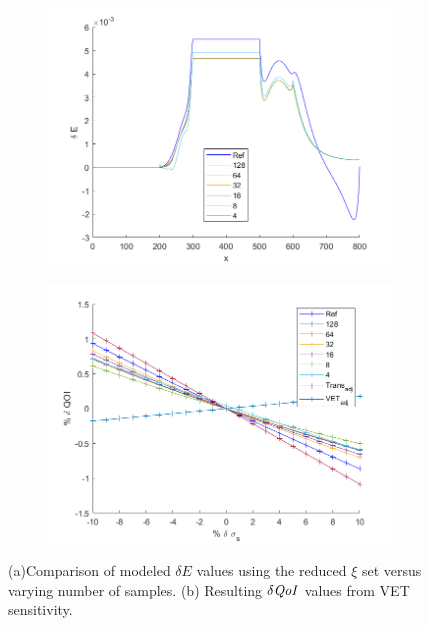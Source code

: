 \documentclass{article}
\newcommand{\qoi}{{\it QoI}\xspace}
\begin{document}
\begin{figure}[H]
\centering
  \begin{subfigure}{.5\textwidth}
  \includegraphics[width=0.98 \linewidth]{E2_nsamples.png}
  \caption{}
  \label{fig:E2n}
  \end{subfigure}%
  \begin{subfigure}{.5\textwidth}
  \includegraphics[width=0.98 \linewidth]{E2_dqoi.png}
  \caption{}
  \label{fig:E2dqoi}
  \end{subfigure}%
  \caption{(a)Comparison of modeled $\delta E$ values using the reduced $\xi$ set versus varying number of samples. (b) Resulting $\delta \qoi$ values from VET sensitivity.}
\end{figure} 
\end{document}

